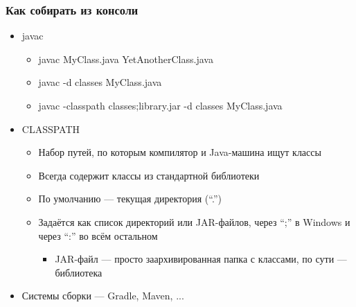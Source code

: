 \documentclass[xetex,mathserif,serif]{beamer}
\begin{document}
	\begin{frame}
		\frametitle{Как собирать из консоли}
		\begin{itemize}
			\item javac
			\begin{itemize}
				\item javac MyClass.java YetAnotherClass.java
				\item javac -d classes MyClass.java
				\item javac -classpath classes;library.jar -d classes MyClass.java
			\end{itemize}
			\item CLASSPATH
			\begin{itemize}
				\item Набор путей, по которым компилятор и Java-машина ищут классы
				\item Всегда содержит классы из стандартной библиотеки
				\item По умолчанию --- текущая директория (``.'')
				\item Задаётся как список директорий или JAR-файлов, через ``;'' в Windows и через ``:'' во всём остальном
				\begin{itemize}
					\item JAR-файл --- просто заархивированная папка с классами, по сути --- библиотека
				\end{itemize}
			\end{itemize}
			\item Системы сборки --- Gradle, Maven, ...
		\end{itemize}
	\end{frame}
\end{document}
